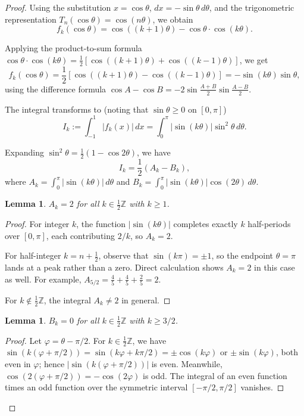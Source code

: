 \documentclass[11pt]{article}
\newtheorem{lemma}[theorem]{Lemma}
\begin{document}
\begin{proof}
Using the substitution $x = \cos\theta$, $dx = -\sin\theta \, d\theta$, and the
trigonometric representation $T_n(\cos\theta) = \cos(n\theta)$, we obtain
\begin{equation}
f_k(\cos\theta) = \cos((k+1)\theta) - \cos\theta \cdot \cos(k\theta).
\end{equation}

Applying the product-to-sum formula
$\cos\theta \cdot \cos(k\theta) = \frac{1}{2}[\cos((k+1)\theta) + \cos((k-1)\theta)]$,
we get
\begin{equation}
f_k(\cos\theta) = \frac{1}{2}[\cos((k+1)\theta) - \cos((k-1)\theta)] = -\sin(k\theta)\sin\theta,
\end{equation}
using the difference formula $\cos A - \cos B = -2\sin\frac{A+B}{2}\sin\frac{A-B}{2}$.

The integral transforms to (noting that $\sin\theta \geq 0$ on $[0,\pi]$)
\begin{equation}
I_k := \int_{-1}^{1} |f_k(x)| \, dx = \int_{0}^{\pi} |\sin(k\theta)| \sin^2\theta \, d\theta.
\end{equation}

Expanding $\sin^2\theta = \frac{1}{2}(1 - \cos 2\theta)$, we have
\begin{equation}
I_k = \frac{1}{2}(A_k - B_k),
\end{equation}
where $A_k = \int_{0}^{\pi} |\sin(k\theta)| \, d\theta$ and
$B_k = \int_{0}^{\pi} |\sin(k\theta)| \cos(2\theta) \, d\theta$.

\begin{lemma}\label{lem:A}
$A_k = 2$ for all $k \in \tfrac{1}{2}\mathbb{Z}$ with $k \geq 1$.
\end{lemma}
\begin{proof}
For integer $k$, the function $|\sin(k\theta)|$ completes exactly $k$ half-periods
over $[0,\pi]$, each contributing $2/k$, so $A_k = 2$.

For half-integer $k = n + \tfrac{1}{2}$, observe that $\sin(k\pi) = \pm 1$, so the
endpoint $\theta = \pi$ lands at a peak rather than a zero. Direct calculation shows
$A_k = 2$ in this case as well. For example, $A_{5/2} = \tfrac{4}{5} + \tfrac{4}{5} + \tfrac{2}{5} = 2$.

For $k \notin \tfrac{1}{2}\mathbb{Z}$, the integral $A_k \neq 2$ in general.
\end{proof}

\begin{lemma}\label{lem:B}
$B_k = 0$ for all $k \in \tfrac{1}{2}\mathbb{Z}$ with $k \geq 3/2$.
\end{lemma}
\begin{proof}
Let $\varphi = \theta - \pi/2$. For $k \in \tfrac{1}{2}\mathbb{Z}$, we have
$\sin(k(\varphi + \pi/2)) = \sin(k\varphi + k\pi/2) = \pm\cos(k\varphi)$ or
$\pm\sin(k\varphi)$, both even in $\varphi$; hence $|\sin(k(\varphi + \pi/2))|$
is even. Meanwhile, $\cos(2(\varphi + \pi/2)) = -\cos(2\varphi)$ is odd.
The integral of an even function times an odd function over the symmetric
interval $[-\pi/2, \pi/2]$ vanishes.


\end{proof}
\end{proof}
\end{document}
